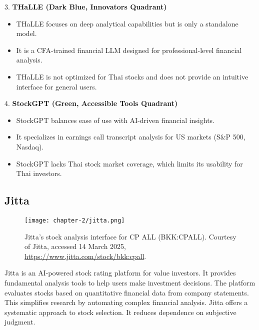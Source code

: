 3. \textbf{THaLLE (Dark Blue, Innovators Quadrant)}

\begin{itemize}[leftmargin=80pt]
    \item THaLLE focuses on deep analytical capabilities but is only a standalone model.
    \item It is a CFA-trained financial LLM designed for professional-level financial analysis.
    \item THaLLE is not optimized for Thai stocks and does not provide an intuitive interface for general users.
\end{itemize}

4. \textbf{StockGPT (Green, Accessible Tools Quadrant)}

\begin{itemize}[leftmargin=80pt]
    \item StockGPT balances ease of use with AI-driven financial insights.
    \item It specializes in earnings call transcript analysis for US markets (S\&P 500, Nasdaq).
    \item StockGPT lacks Thai stock market coverage, which limits its usability for Thai investors.
\end{itemize}

\newpage

\subsection{Jitta}
\label{subsection:jitta}

\begin{figure}[h]
    \centering
    \texttt{[image: chapter-2/jitta.png]}
    \caption{Jitta's stock analysis interface for CP ALL (BKK:CPALL). Courtesy of Jitta, accessed 14 March 2025, \url{https://www.jitta.com/stock/bkk:cpall}.}
    \label{fig:jitta}
\end{figure}

\FloatBarrier

Jitta is an AI-powered stock rating platform for value investors. It provides fundamental analysis tools to help users make investment decisions. 
The platform evaluates stocks based on quantitative financial data from company statements. This simplifies research by automating complex financial analysis. 
Jitta offers a systematic approach to stock selection. It reduces dependence on subjective judgment.


